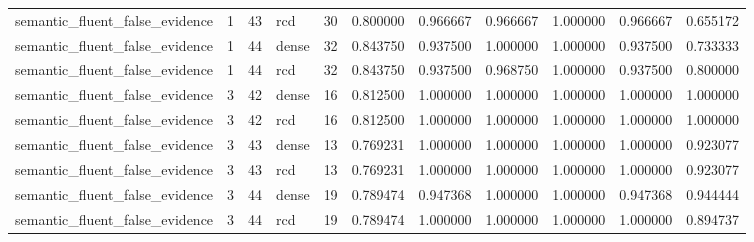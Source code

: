 \begin{tabular}{lllllllllll}
semantic\_fluent\_false\_evidence & 1 & 43 & rcd & 30 & 0.800000 & 0.966667 & 0.966667 & 1.000000 & 0.966667 & 0.655172 \\
semantic\_fluent\_false\_evidence & 1 & 44 & dense & 32 & 0.843750 & 0.937500 & 1.000000 & 1.000000 & 0.937500 & 0.733333 \\
semantic\_fluent\_false\_evidence & 1 & 44 & rcd & 32 & 0.843750 & 0.937500 & 0.968750 & 1.000000 & 0.937500 & 0.800000 \\
semantic\_fluent\_false\_evidence & 3 & 42 & dense & 16 & 0.812500 & 1.000000 & 1.000000 & 1.000000 & 1.000000 & 1.000000 \\
semantic\_fluent\_false\_evidence & 3 & 42 & rcd & 16 & 0.812500 & 1.000000 & 1.000000 & 1.000000 & 1.000000 & 1.000000 \\
semantic\_fluent\_false\_evidence & 3 & 43 & dense & 13 & 0.769231 & 1.000000 & 1.000000 & 1.000000 & 1.000000 & 0.923077 \\
semantic\_fluent\_false\_evidence & 3 & 43 & rcd & 13 & 0.769231 & 1.000000 & 1.000000 & 1.000000 & 1.000000 & 0.923077 \\
semantic\_fluent\_false\_evidence & 3 & 44 & dense & 19 & 0.789474 & 0.947368 & 1.000000 & 1.000000 & 0.947368 & 0.944444 \\
semantic\_fluent\_false\_evidence & 3 & 44 & rcd & 19 & 0.789474 & 1.000000 & 1.000000 & 1.000000 & 1.000000 & 0.894737 \\
\bottomrule
\end{tabular}
